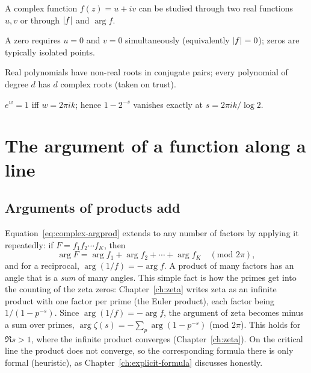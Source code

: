 \begin{keyideas}
\item A complex function $f(z)=u+iv$ can be studied through two real functions $u,v$ or through $\left\lvert f\right\rvert$ and $\arg f$.
\item A zero requires $u=0$ and $v=0$ simultaneously (equivalently $\left\lvert f\right\rvert=0$); zeros are typically isolated points.
\item Real polynomials have non-real roots in conjugate pairs; every polynomial of degree $d$ has $d$ complex roots (taken on trust).
\item $e^w=1$ iff $w=2\pi ik$; hence $1-2^{-s}$ vanishes exactly at $s=2\pi ik/\log2$.
\end{keyideas}

\section{The argument of a function along a line}\label{sec:complex-phase}

\subsection{Arguments of products add}

Equation~\eqref{eq:complex-argprod} extends to any number of factors by applying it repeatedly: if $F=f_1f_2\cdots f_K$, then
\begin{equation}
\arg F=\arg f_1+\arg f_2+\cdots+\arg f_K\quad(\text{mod }2\pi),\label{eq:complex-argmany}
\end{equation}
and for a reciprocal, $\arg(1/f)=-\arg f$. A product of many factors has an angle that is a \emph{sum} of many angles. This simple fact is how the primes get into the counting of the zeta zeros: Chapter~\ref{ch:zeta} writes zeta as an infinite product with one factor per prime (the Euler product), each factor being $1/(1-p^{-s})$. Since $\arg(1/f)=-\arg f$, the argument of zeta becomes minus a sum over primes, $\arg\zeta(s)=-\sum_p\arg(1-p^{-s})$ (mod $2\pi$). This holds for $\Re s>1$, where the infinite product converges (Chapter~\ref{ch:zeta}). On the critical line the product does not converge, so the corresponding formula there is only formal (heuristic), as Chapter~\ref{ch:explicit-formula} discusses honestly.

